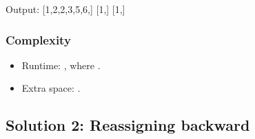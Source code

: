 \documentclass[letterpaper,12pt,english]{book}
\begin{document}
\begin{sphinxVerbatim}[commandchars=\\\{\}]
\end{sphinxVerbatim}

\begin{sphinxVerbatim}[commandchars=\\\{\}]
Output:
[1,2,2,3,5,6,]
[1,]
[1,]
\end{sphinxVerbatim}


\subsubsection{Complexity}
\label{\detokenize{Sorting/04_SORT_88_Merge_Sorted_Array:complexity}}\begin{itemize}
\item {} 
\sphinxAtStartPar
Runtime: , where .

\item {} 
\sphinxAtStartPar
Extra space: .

\end{itemize}


\subsection{Solution 2: Reassigning  backward}
\label{\detokenize{Sorting/04_SORT_88_Merge_Sorted_Array:solution-2-reassigning-nums1-backward}}
\end{document}
